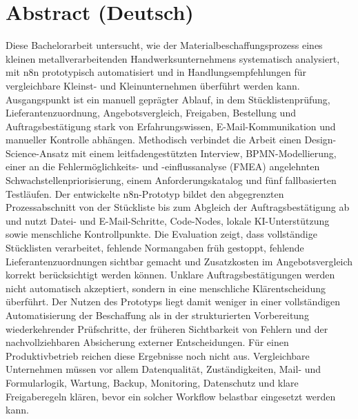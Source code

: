 \documentclass[a4paper,12pt]{article}
\begin{document}
\hypersetup{pageanchor=false}
\begingroup
{}

\endgroup
\clearpage
\hypersetup{pageanchor=true}


\section*{Abstract (Deutsch)}
Diese Bachelorarbeit untersucht, wie der Materialbeschaffungsprozess eines kleinen metallverarbeitenden Handwerksunternehmens systematisch analysiert, mit n8n prototypisch automatisiert und in Handlungsempfehlungen für vergleichbare Kleinst- und Kleinunternehmen überführt werden kann. Ausgangspunkt ist ein manuell geprägter Ablauf, in dem Stücklistenprüfung, Lieferantenzuordnung, Angebotsvergleich, Freigaben, Bestellung und Auftragsbestätigung stark von Erfahrungswissen, E-Mail-Kommunikation und manueller Kontrolle abhängen. Methodisch verbindet die Arbeit einen Design-Science-Ansatz mit einem leitfadengestützten Interview, BPMN-Modellierung, einer an die Fehlermöglichkeits- und -einflussanalyse (FMEA) angelehnten Schwachstellenpriorisierung, einem Anforderungskatalog und fünf fallbasierten Testläufen. Der entwickelte n8n-Prototyp bildet den abgegrenzten Prozessabschnitt von der Stückliste bis zum Abgleich der Auftragsbestätigung ab und nutzt Datei- und E-Mail-Schritte, Code-Nodes, lokale KI-Unterstützung sowie menschliche Kontrollpunkte. Die Evaluation zeigt, dass vollständige Stücklisten verarbeitet, fehlende Normangaben früh gestoppt, fehlende Lieferantenzuordnungen sichtbar gemacht und Zusatzkosten im Angebotsvergleich korrekt berücksichtigt werden können. Unklare Auftragsbestätigungen werden nicht automatisch akzeptiert, sondern in eine menschliche Klärentscheidung überführt. Der Nutzen des Prototyps liegt damit weniger in einer vollständigen Automatisierung der Beschaffung als in der strukturierten Vorbereitung wiederkehrender Prüfschritte, der früheren Sichtbarkeit von Fehlern und der nachvollziehbaren Absicherung externer Entscheidungen. Für einen Produktivbetrieb reichen diese Ergebnisse noch nicht aus. Vergleichbare Unternehmen müssen vor allem Datenqualität, Zuständigkeiten, Mail- und Formularlogik, Wartung, Backup, Monitoring, Datenschutz und klare Freigaberegeln klären, bevor ein solcher Workflow belastbar eingesetzt werden kann.
\end{document}
